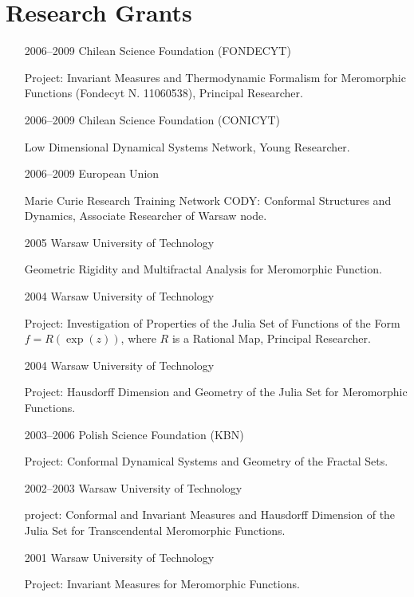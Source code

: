 \documentclass{article}
\begin{document}
\section*{Research Grants}

\begin{itemize}
\item[2006--2009] Chilean Science Foundation (FONDECYT) 

  Project: Invariant Measures and Thermodynamic Formalism for
  Meromorphic Functions (Fondecyt N. 11060538), Principal Researcher.
\item[2006--2009] Chilean Science Foundation (CONICYT) 

  Low Dimensional Dynamical Systems Network, Young Researcher.
\item[2006--2009] European Union

  Marie Curie Research Training Network CODY: Conformal Structures and
  Dynamics, Associate Researcher of Warsaw node.
\item[2005] Warsaw University of Technology

  Geometric Rigidity and Multifractal Analysis for Meromorphic
  Function.
\item[2004] Warsaw University of Technology

  Project: Investigation of Properties of the Julia Set of Functions
  of the Form $f=R(\exp(z))$, where $R$ is a Rational Map, Principal
  Researcher.
\item[2004] Warsaw University of Technology

  Project: Hausdorff Dimension and Geometry of the Julia Set for Meromorphic
  Functions.
\item[2003--2006] Polish Science Foundation (KBN)

  Project: Conformal Dynamical Systems and Geometry of the Fractal Sets.
\item[2002--2003] Warsaw University of Technology 

  project: Conformal and Invariant Measures and Hausdorff Dimension of the
  Julia Set for Transcendental Meromorphic Functions.
\item[2001] Warsaw University of Technology

  Project: Invariant Measures for Meromorphic Functions.


\end{itemize}
\end{document}
